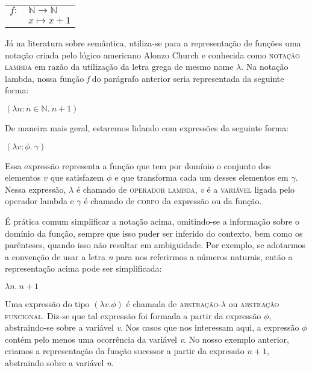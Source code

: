 \begin{exe}
	\ex \begin{tabular}[t]{l l} 
			$f:$ & $\mathbb{N} \rightarrow \mathbb{N}$\\  
	     		 &  $x \mapsto x + 1$\\ 
   		\end{tabular}
\end{exe}

Já na literatura sobre semântica, utiliza-se para a representação de funções uma notação criada pelo
lógico americano Alonzo Church e conhecida como \textsc{notação
lambda} em razão da utilização da letra grega de mesmo nome
$\lambda$. Na notação lambda, nossa função \textit{f} do
parágrafo anterior seria
representada da seguinte forma:

\begin{exe}
	\ex $(\lambda n: n \in \mathbb{N}.\ n + 1)$
\end{exe}

\n De maneira mais geral, estaremos lidando com expressões da
seguinte forma:

\begin{exe}
	\ex $(\lambda v:\phi .\ \gamma)$
\end{exe}

\n Essa expressão representa a função que tem por domínio o
conjunto dos elementos $v$ que satisfazem $\phi$ e que transforma
cada um desses elementos em $\gamma$. Nessa expressão, $\lambda$ é
chamado de \textsc{operador lambda}, \textit{v} é a \textsc{variável}
ligada pelo operador lambda e $\gamma$ é chamado de \textsc{corpo}
da expressão ou da função.

É prática comum simplificar a notação acima, omitindo-se a
informação sobre o domínio da função, sempre que isso puder
ser inferido do contexto, bem como os parênteses, quando isso não resultar em ambiguidade. Por exemplo, se adotarmos 
a convenção de usar a letra \textit{n} para nos referirmos a
números naturais, então a representação acima pode ser simplificada:

\begin{exe}
	\ex $\lambda n.\ n + 1$
\end{exe}

\n Uma expressão do tipo $(\lambda v. \phi)$ é chamada de
\textsc{abstração}-$\lambda$ ou \textsc{abstração funcional}.
Diz-se que tal expressão foi formada a partir da expressão $\phi$,
abstraindo-se sobre a variável \textit{v}. Nos casos que nos
interessam aqui, a expressão $\phi$ contém pelo menos uma
ocorrência da variável \textit{v}. No nosso exemplo
anterior, criamos a representação da função sucessor a partir
da expressão $n + 1$, abstraindo sobre a variável \textit{n}.

